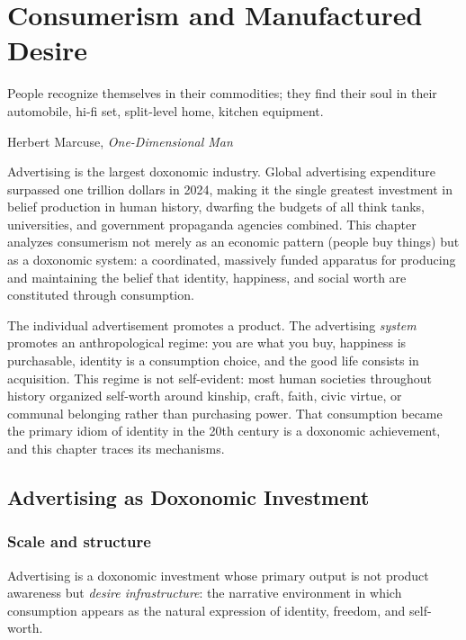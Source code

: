 \chapter{Consumerism and Manufactured Desire}
\label{ch:consumerism}

\epigraph{People recognize themselves in their commodities; they find their soul in their automobile, hi-fi set, split-level home, kitchen equipment.}{Herbert Marcuse, \textit{One-Dimensional Man}}

\noindent
Advertising is the largest doxonomic industry.
Global advertising expenditure surpassed one trillion dollars in 2024, making it the single greatest investment in belief production in human history, dwarfing the budgets of all think tanks, universities, and government propaganda agencies combined.
This chapter analyzes consumerism not merely as an economic pattern (people buy things) but as a doxonomic system: a coordinated, massively funded apparatus for producing and maintaining the belief that identity, happiness, and social worth are constituted through consumption.

The individual advertisement promotes a product.
The advertising \emph{system} promotes an anthropological regime: you are what you buy, happiness is purchasable, identity is a consumption choice, and the good life consists in acquisition.
This regime is not self-evident: most human societies throughout history organized self-worth around kinship, craft, faith, civic virtue, or communal belonging rather than purchasing power.
That consumption became the primary idiom of identity in the 20th century is a doxonomic achievement, and this chapter traces its mechanisms.

\section{Advertising as Doxonomic Investment}
\label{sec:ch23-advertising}

\subsection{Scale and structure}

\begin{definition}
\label{def:advertising-doxonomic}
Advertising is a doxonomic investment whose primary output is not product awareness but \emph{desire infrastructure}: the narrative environment in which consumption appears as the natural expression of identity, freedom, and self-worth.
\end{definition}

